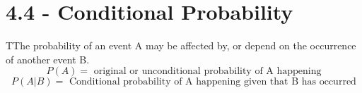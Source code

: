 \documentclass{report}
\begin{document}
\section {4.4 - Conditional Probability}
\bigbreak \noindent
TThe probability of an event A may be affected by, or depend on the occurrence of another event B.
$$P(A) = \text{ original or unconditional probability of A happening}$$
$$ P(A|B) = \text{ Conditional probability of A happening given that B has occurred}$$
\bigbreak \noindent \bigbreak \noindent
{}


\begin{figure}[ht]
    \centering
\end{figure}
\end{document}
